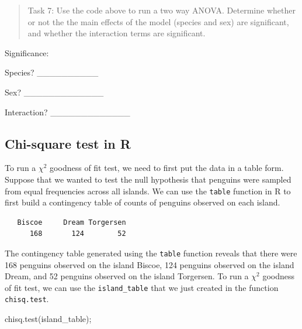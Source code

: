 \documentclass[
]{scrbook}
\newenvironment{Shaded}{\begin{snugshade}}{\end{snugshade}}
\newcommand{\FunctionTok}[1]{\textcolor[rgb]{0.00,0.00,0.00}{#1}}
\newcommand{\NormalTok}[1]{#1}
\newcommand{\OtherTok}[1]{\textcolor[rgb]{0.56,0.35,0.01}{#1}}
\newcommand{\SpecialCharTok}[1]{\textcolor[rgb]{0.00,0.00,0.00}{#1}}
\begin{document}
\begin{quote}
Task 7: Use the code above to run a two way ANOVA. Determine whether or not the the main effects of the model (species and sex) are significant, and whether the interaction terms are significant.
\end{quote}

Significance:

Species? \_\_\_\_\_\_\_\_\_\_

Sex? \_\_\_\_\_\_\_\_\_\_\_\_\_

Interaction? \_\_\_\_\_\_\_\_\_\_\_\_\_

\hypertarget{chi-square-test-in-r}{%
\subsection{Chi-square test in R}\label{chi-square-test-in-r}}

To run a \(\chi^{2}\) goodness of fit test, we need to first put the data in a table form.
Suppose that we wanted to test the null hypothesis that penguins were sampled from equal frequencies across all islands.
We can use the \texttt{table} function in R to first build a contingency table of counts of penguins observed on each island.

\begin{Shaded}
\end{Shaded}

\begin{verbatim}
   Biscoe     Dream Torgersen 
      168       124        52 
\end{verbatim}

The contingency table generated using the \texttt{table} function reveals that there were 168 penguins observed on the island Biscoe, 124 penguins observed on the island Dream, and 52 penguins observed on the island Torgersen.
To run a \(\chi^{2}\) goodness of fit test, we can use the \texttt{island\_table} that we just created in the function \texttt{chisq.test}.

\begin{Shaded}
\begin{Highlighting}[]
\FunctionTok{chisq.test}\NormalTok{(island\_table);}
\end{Highlighting}
\end{Shaded}
\end{document}
